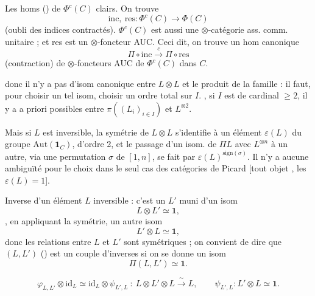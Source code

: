 \documentclass[11pt,a4paper]{article}
\begin{document}

Les homs () de $\Phi^c(C)$ clairs. On trouve
\[
\mathrm{inc},\ \mathrm{res} : \Phi^{c}(C) \longrightarrow \Phi(C)
\]
(oubli des indices contractés). $\Phi^{c}(C)$ est aussi une
$\otimes$-catégorie ass. comm. unitaire ; et res est un $\otimes$-foncteur
AUC. Ceci dit, on trouve un hom canonique
\[
\Pi \circ \mathrm{inc} \xrightarrow{\ c\ } \Pi \circ \mathrm{res}
\]
(contraction) de $\otimes$-foncteurs AUC de $\Phi^{c}(C)$ dans $C$.

donc il n'y a pas d'isom canonique entre $L \otimes L$ et le produit de la
famille  : il faut, pour choisir
un tel isom, choisir un ordre total sur $I$. , si $I$
est de cardinal $\geq 2$, il y a a priori \ill{} possibles entre
$\pi((L_i)_{i\in I})$ et $L^{\otimes 2}$. 

Mais si $L$ est inversible, la symétrie de $L \otimes L$ s'identifie à un
élément $\varepsilon(L)$ du groupe $\mathrm{Aut}(\mathbf{1}_C)$, d'ordre 2,
et le passage d'un isom. de $\Pi L$ avec $L^{\otimes n}$ à un autre, via
une permutation $\sigma$ de $[1, n]$, se fait par
$\varepsilon(L)^{\mathrm{sign}(\sigma)}$. Il n'y a aucune ambiguïté pour le
choix dans le seul cas des catégories de Picard [tout objet
, les $\varepsilon(L) = 1$].

Inverse d'un élément $L$ inversible : c'est un $L'$ muni d'un isom
\[
L \otimes L' \simeq \mathbf{1},
\]
, en appliquant la symétrie, un autre isom
\[
L' \otimes L \simeq \mathbf{1},
\]
donc les relations entre $L$ et $L'$ sont symétriques ; on convient de dire
que $(L, L')$ () est un couple d'inverses si on
se donne un isom
\[
\Pi(L, L') \simeq \mathbf{1}.
\]


\[
\varphi_{L,L'} \otimes \mathrm{id}_L \simeq \mathrm{id}_L \otimes \psi_{L',L}
\ :\ L \otimes L' \otimes L \xrightarrow{\ \sim\ } L,
\qquad \psi_{L',L} : L' \otimes L \simeq \mathbf{1}.
\]
\end{document}
